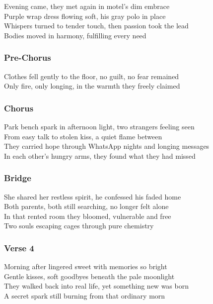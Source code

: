 Evening came, they met again in motel's dim embrace\\
Purple wrap dress flowing soft, his gray polo in place\\
Whispers turned to tender touch, then passion took the lead\\
Bodies moved in harmony, fulfilling every need

\subsubsection{Pre-Chorus}\label{pre-chorus-50}

Clothes fell gently to the floor, no guilt, no fear remained\\
Only fire, only longing, in the warmth they freely claimed

\subsubsection{Chorus}\label{chorus-74}

Park bench spark in afternoon light, two strangers feeling seen\\
From easy talk to stolen kiss, a quiet flame between\\
They carried hope through WhatsApp nights and longing messages\\
In each other's hungry arms, they found what they had missed

\subsubsection{Bridge}\label{bridge-26}

She shared her restless spirit, he confessed his faded home\\
Both parents, both still searching, no longer felt alone\\
In that rented room they bloomed, vulnerable and free\\
Two souls escaping cages through pure chemistry

\subsubsection{Verse 4}\label{verse-4-7}

Morning after lingered sweet with memories so bright\\
Gentle kisses, soft goodbyes beneath the pale moonlight\\
They walked back into real life, yet something new was born\\
A secret spark still burning from that ordinary morn

